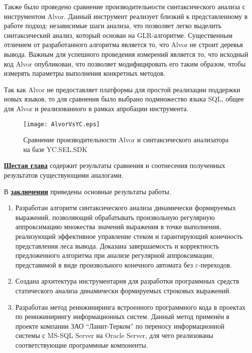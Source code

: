 Также было проведено сравнение производительности синтаксического анализа с инструментом Alvor. Данный инструмент реализует  близкий к представленному в работе подход: независимые шаги анализа, что позволяет легко выделить синтаксический анализ, который основан на GLR-алгоритме. Существенным отличием от разработанного алгоритма является то, что Alvor не строит деревья вывода. Важным для успешного проведения измерений является то, что исходный код Alvor опубликован, что позволяет модифицировать его таким образом, чтобы измерять параметры выполнения конкретных методов. 

Так как Alvor не предоставляет платформы для простой реализации поддержки новых языков, то для сравнения было выбрано подмножество языка SQL, общее для Alvor и реализованного в рамках апробации инструмента. 

\begin{figure}[h!]
 \centering
 \texttt{[image: AlvorVsYC.eps]}
 \caption{Сравнение производительности Alvor и синтаксического анализатора на базе YC.SEL.SDK}
 \label{fig:YCvsAlvor}
\end{figure}

\underline{\textbf{Шестая глава}} содержит результаты сравнения и соотнесения полученных результатов существующими аналогами.

В \underline{\textbf{заключении}} приведены основные результаты работы.
\begin{enumerate}
    \item Разработан алгоритм синтаксического анализа динамически формируемых выражений, позволяющий обрабатывать произвольную регулярную аппроксимацию множества значений выражения в точке выполнения, реализующий 
    эффективное управление стеком и гарантирующий конечность представления леса вывода. Доказана завершаемость и корректность предложенного алгоритма при анализе регулярной аппроксимации, представимой в виде произвольного конечного автомата без $\varepsilon$-переходов.
    \item Создана архитектура инструментария для разработки программных средств статического анализа динамически формируемых строковых выражений.
    \item Разработан метод реинжиниринга встроенного программного кода в проектах по реинжинирингу информационных систем. Данный метод применён в проекте компании ЗАО ``Ланит-Терком'' по переносу информационной системы с MS-SQL Server на Oracle Server, для чего реализованы соответствующие программные компоненты.
\end{enumerate}

